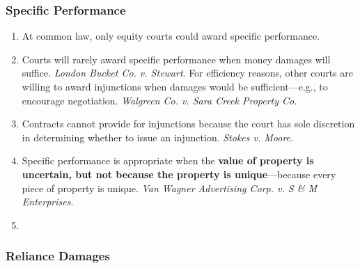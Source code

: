 \subsubsection{Specific Performance}

\begin{enumerate}
    \item At common law, only equity courts could award specific performance.
    \item Courts will rarely award specific performance when money damages 
    will suffice. \emph{London Bucket Co. v. Stewart}. For efficiency reasons, 
    other courts are willing to award injunctions when damages would be 
    sufficient---e.g., to encourage negotiation. \emph{Walgreen Co. v. Sara 
    Creek Property Co.}
    \item Contracts cannot provide for injunctions because the court has sole 
    discretion in determining whether to issue an injunction. \emph{Stokes v. 
    Moore}.
    \item Specific performance is appropriate when the \textbf{value of property is 
    uncertain, but not because the property is unique}---because every piece 
    of property is unique.  \emph{Van Wagner Advertising Corp. v. S \& M 
    Enterprises}.
    \item %
\end{enumerate}

\subsubsection{Reliance Damages}

